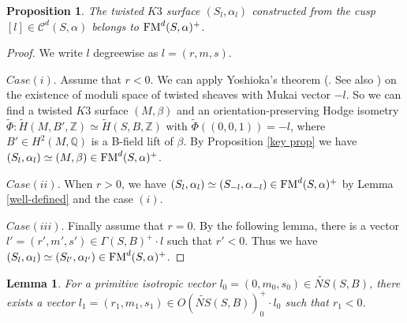 \documentclass{article}
\theoremstyle{plain}
\newtheorem{proposition}[theorem]{Proposition}%
\newtheorem{lemma}[theorem]{Lemma}%
\theoremstyle{definition}
\theoremstyle{remark}
\newcommand{\Z}{{\mathbb Z}}
\newcommand{\Q}{{\mathbb Q}}
\begin{document}
\begin{proposition}\label{belong to the subset}
The twisted $K3$ surface $(S_{l}, \alpha _{l})$ 
constructed from the cusp 
$[l] \in \mathcal{C}^{d}(S, \alpha ) $ 
belongs to 
${\rm FM\/}^{d}(S, \alpha )^{+}$. 
\end{proposition}





\begin{proof}
We write $l$ degreewise as $l = (r, m, s)$. 

$Case (i)$. 
Assume that $r<0$. 
We can apply 
Yoshioka's theorem (\cite{Yo}. See also \cite{H-S2}) 
on the existence of moduli space of twisted sheaves with Mukai vector $-l$. 
So 
we can find a twisted $K3$ surface $(M, \beta )$ 
and an orientation-preserving Hodge isometry 
$\widetilde{\Phi} : 
\widetilde{H}(M, B', {\Z}) \simeq \widetilde{H}(S, B, {\Z})$ 
with 
$\widetilde{\Phi}((0, 0, 1)) = -l$, 
where 
$B' \in H^{2}(M, {\Q})$ 
is a B-field lift of $\beta $. 
By Proposition \ref{key prop} we have 
$(S_{l}, \alpha _{l}) \simeq (M, \beta ) \in {\rm FM\/}^{d}(S, \alpha )^{+}$. 



$Case (ii)$.  
When $r>0$, 
we have 
$(S_{l}, \alpha _{l}) \simeq (S_{-l}, \alpha _{-l}) \in {\rm FM\/}^{d}(S, \alpha )^{+}$ 
by Lemma \ref{well-defined} and the case $(i)$. 



$Case (iii)$.
Finally assume that $r=0$. 
By the following lemma, 
there is a vector 
$l' = (r', m', s') \in \Gamma (S, B)^{+} \cdot l$ 
such that  
$r'<0$. 
Thus we have 
$(S_{l}, \alpha _{l}) \simeq (S_{l'}, \alpha _{l'}) \in {\rm FM\/}^{d}(S, \alpha )^{+}$. 
\end{proof} 











\begin{lemma}\label{auxiliary}
For a primitive isotropic vector 
$l_{0} = (0, m_{0}, s_{0}) \in \widetilde{NS}(S, B)$, 
there exists a vector 
$l_{1} = (r_{1}, m_{1}, s_{1}) \in O(\widetilde{NS}(S, B))_{0}^{+} \cdot l_{0}$ 
such that 
$r_{1}<0$. 
\end{lemma}
\end{document}
